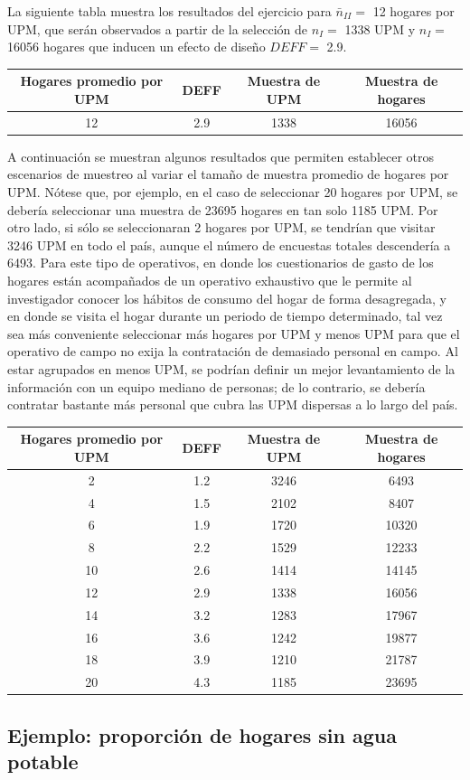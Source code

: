 \documentclass[12pt,spanish,]{book}
\begin{document}
La siguiente tabla muestra los resultados del ejercicio para \(\bar{n}_{II} =\) 12 hogares por UPM, que serán observados a partir de la selección de \(n_{I} =\) 1338 UPM y \(n_{I} =\) 16056 hogares que inducen un efecto de diseño \(DEFF =\) 2.9.

\begin{longtable}[]{@{}cccc@{}}
\toprule
Hogares promedio por UPM & DEFF & Muestra de UPM & Muestra de hogares\tabularnewline
\midrule
\endhead
12 & 2.9 & 1338 & 16056\tabularnewline
\bottomrule
\end{longtable}

A continuación se muestran algunos resultados que permiten establecer otros escenarios de muestreo al variar el tamaño de muestra promedio de hogares por UPM. Nótese que, por ejemplo, en el caso de seleccionar 20 hogares por UPM, se debería seleccionar una muestra de 23695 hogares en tan solo 1185 UPM. Por otro lado, si sólo se seleccionaran 2 hogares por UPM, se tendrían que visitar 3246 UPM en todo el país, aunque el número de encuestas totales descendería a 6493. Para este tipo de operativos, en donde los cuestionarios de gasto de los hogares están acompañados de un operativo exhaustivo que le permite al investigador conocer los hábitos de consumo del hogar de forma desagregada, y en donde se visita el hogar durante un periodo de tiempo determinado, tal vez sea más conveniente seleccionar más hogares por UPM y menos UPM para que el operativo de campo no exija la contratación de demasiado personal en campo. Al estar agrupados en menos UPM, se podrían definir un mejor levantamiento de la información con un equipo mediano de personas; de lo contrario, se debería contratar bastante más personal que cubra las UPM dispersas a lo largo del país.

\begin{longtable}[]{@{}cccc@{}}
\toprule
Hogares promedio por UPM & DEFF & Muestra de UPM & Muestra de hogares\tabularnewline
\midrule
\endhead
2 & 1.2 & 3246 & 6493\tabularnewline
4 & 1.5 & 2102 & 8407\tabularnewline
6 & 1.9 & 1720 & 10320\tabularnewline
8 & 2.2 & 1529 & 12233\tabularnewline
10 & 2.6 & 1414 & 14145\tabularnewline
12 & 2.9 & 1338 & 16056\tabularnewline
14 & 3.2 & 1283 & 17967\tabularnewline
16 & 3.6 & 1242 & 19877\tabularnewline
18 & 3.9 & 1210 & 21787\tabularnewline
20 & 4.3 & 1185 & 23695\tabularnewline
\bottomrule
\end{longtable}

\hypertarget{ejemplo-proporcion-de-hogares-sin-agua-potable}{%
\subsection{Ejemplo: proporción de hogares sin agua potable}\label{ejemplo-proporcion-de-hogares-sin-agua-potable}}
\end{document}
